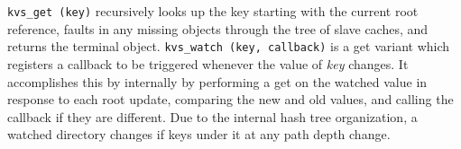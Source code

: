 %
{\tt kvs\_get (key)} recursively looks up the key starting with the
current root reference, faults in any missing objects
through the tree of slave caches, and returns the terminal object.
{\tt kvs\_watch (key, callback)} is a get variant which registers a
callback to be triggered whenever the value of {\em key} changes.
It accomplishes this by internally by performing a get on the watched
value in response to each root update, comparing the new
and old values, and calling the callback if they are different.
Due to the internal hash tree organization, a watched directory changes
if keys under it at any path depth change.

%
%
